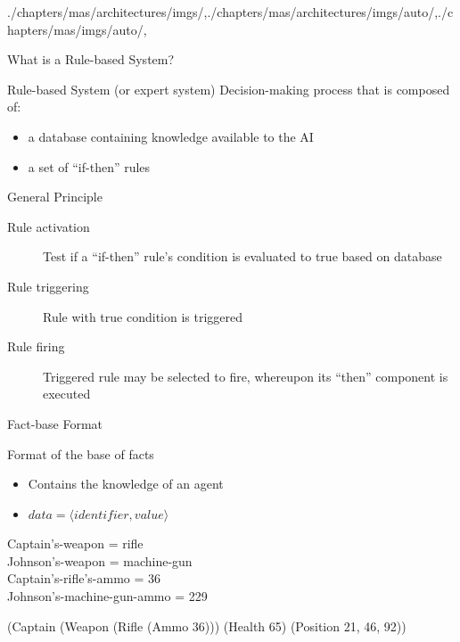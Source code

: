 \begin{graphicspathcontext}{{./chapters/mas/architectures/imgs/},{./chapters/mas/architectures/imgs/auto/},{./chapters/mas/imgs/auto/},\old}

\begin{frame}{What is a Rule-based System?}
	\begin{definitionblock}{Rule-based System (or expert system)}
		Decision-making process that is composed of:
		\begin{itemize}
		\item a database containing knowledge available to the AI
		\item a set of ``if-then'' rules
		\end{itemize}
	\end{definitionblock}
	\vspace{.5cm}
	\begin{block}{General Principle}
		\begin{description}
		\item[Rule activation] Test if a ``if-then'' rule's condition is evaluated to true based on database
		\item[Rule triggering] Rule with true condition is triggered
		\item[Rule firing] Triggered rule may be selected to fire, whereupon its ``then'' component is executed
		\end{description}
	\end{block}
\end{frame}

\begin{frame}[t,fragile]{Fact-base Format}
	\begin{block}{Format of the base of facts}
		\begin{itemize}
			\item Contains the knowledge of an agent
			\item $data = \langle identifier, value \rangle$
		\end{itemize}
	\end{block}
	\begin{example}\ttfamily
		Captain's-weapon = rifle \\
		Johnson's-weapon = machine-gun \\
		Captain's-rifle's-ammo = 36 \\
		Johnson's-machine-gun-ammo = 229
	\end{example}
	\begin{example}\ttfamily
		\vspace{-.8em}\begin{sarllisting}[language=lisp,basicstyle=\small]
(Captain
	(Weapon (Rifle (Ammo 36)))
	(Health 65)
	(Position 21, 46, 92))
		\end{sarllisting}\vspace{-3em}
	\end{example}
\end{frame}


\end{graphicspathcontext}
